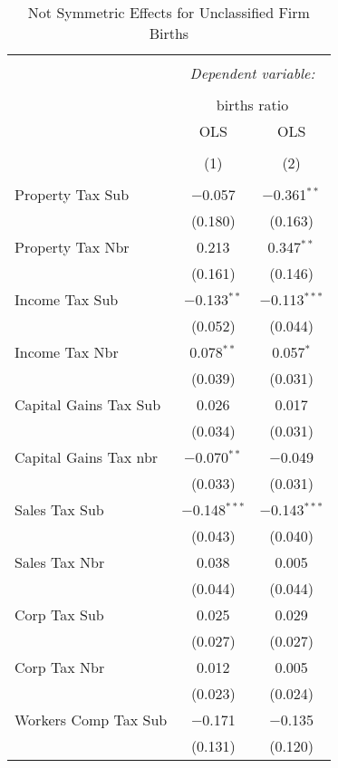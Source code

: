 
\begin{table}[!htbp] \centering 
  \caption{Not Symmetric Effects for  Unclassified Firm Births} 
  \label{} 
\begin{tabular}{@{\extracolsep{5pt}}lcc} 
\\[-1.8ex]\hline 
\hline \\[-1.8ex] 
 & \multicolumn{2}{c}{\textit{Dependent variable:}} \\ 
\cline{2-3} 
\\[-1.8ex] & \multicolumn{2}{c}{births ratio} \\ 
 & OLS & OLS \\ 
\\[-1.8ex] & (1) & (2)\\ 
\hline \\[-1.8ex] 
 Property Tax Sub & $-$0.057 & $-$0.361$^{**}$ \\ 
  & (0.180) & (0.163) \\ 
  Property Tax Nbr & 0.213 & 0.347$^{**}$ \\ 
  & (0.161) & (0.146) \\ 
  Income Tax Sub & $-$0.133$^{**}$ & $-$0.113$^{***}$ \\ 
  & (0.052) & (0.044) \\ 
  Income Tax Nbr & 0.078$^{**}$ & 0.057$^{*}$ \\ 
  & (0.039) & (0.031) \\ 
  Capital Gains Tax Sub & 0.026 & 0.017 \\ 
  & (0.034) & (0.031) \\ 
  Capital Gains Tax nbr & $-$0.070$^{**}$ & $-$0.049 \\ 
  & (0.033) & (0.031) \\ 
  Sales Tax Sub & $-$0.148$^{***}$ & $-$0.143$^{***}$ \\ 
  & (0.043) & (0.040) \\ 
  Sales Tax Nbr & 0.038 & 0.005 \\ 
  & (0.044) & (0.044) \\ 
  Corp Tax Sub & 0.025 & 0.029 \\ 
  & (0.027) & (0.027) \\ 
  Corp Tax Nbr & 0.012 & 0.005 \\ 
  & (0.023) & (0.024) \\ 
  Workers Comp Tax Sub & $-$0.171 & $-$0.135 \\ 
  & (0.131) & (0.120) \\ 

\end{tabular}
\end{table}
